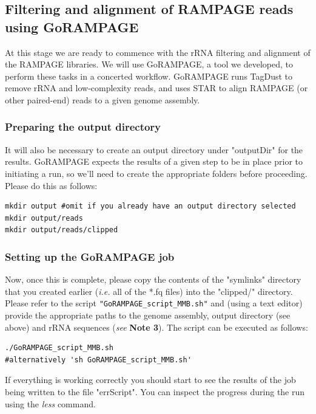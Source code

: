 \documentclass[runningheads,a4paper]{llncs}
\begin{document}
\begin{linenumbers}
\subsection{Filtering and alignment of RAMPAGE reads using GoRAMPAGE}

At this stage we are ready to commence with the rRNA filtering and alignment of the RAMPAGE libraries.
We will use GoRAMPAGE, a tool we developed, to perform these tasks in a concerted workflow. 
GoRAMPAGE runs TagDust \cite{Lassmann:2015gs} to remove rRNA and low-complexity reads, and uses STAR \cite{Dobin:2016kq} to align RAMPAGE (or other paired-end) reads to a given genome assembly.\\

\subsubsection{Preparing the output directory}

It will also be necessary to create an output directory under "outputDir" for the results.
GoRAMPAGE expects the results of a given step to be in place prior to initiating a run, so we'll need to create the appropriate folders before proceeding.
Please do this as follows:

\noindent
\begin{verbatim}
mkdir output #omit if you already have an output directory selected
mkdir output/reads
mkdir output/reads/clipped
\end{verbatim}

\subsubsection{Setting up the GoRAMPAGE job}

Now, once this is complete, please copy the contents of the "symlinks" directory that you created earlier (\textit{i.e.} all of the *.fq files) into the "clipped/" directory.
Please refer to the script \texttt{"GoRAMPAGE\_script\_MMB.sh"} and (using a text editor) provide the appropriate paths to the genome assembly, output directory (see above) and rRNA sequences (\textit{see} \textbf{Note 3}). 
The script can be executed as follows:

\noindent
\begin{verbatim}
./GoRAMPAGE_script_MMB.sh
#alternatively 'sh GoRAMPAGE_script_MMB.sh'
\end{verbatim}

If everything is working correctly you should start to see the results of the job being written to the file "errScript".
You can inspect the progress during the run using the \textit{less} command. 


\end{linenumbers}
\end{document}

